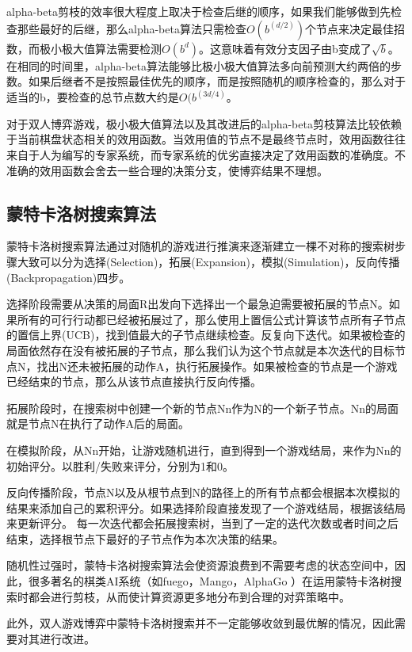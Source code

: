 \documentclass[c5size]{ctexart}
\begin{document}
	alpha-beta剪枝的效率很大程度上取决于检查后继的顺序，如果我们能够做到先检查那些最好的后继，那么alpha-beta算法只需检查$O(b^(d/2))$个节点来决定最佳招数，而极小极大值算法需要检测$O(b^d)$。这意味着有效分支因子由b变成了$\sqrt{b}$。在相同的时间里，alpha-beta算法能够比极小极大值算法多向前预测大约两倍的步数。如果后继者不是按照最佳优先的顺序，而是按照随机的顺序检查的，那么对于适当的b，要检查的总节点数大约是$O(b^(3d/4)$。\par
	
	对于双人博弈游戏，极小极大值算法以及其改进后的alpha-beta剪枝算法比较依赖于当前棋盘状态相关的效用函数。当效用值的节点不是最终节点时，效用函数往往来自于人为编写的专家系统，而专家系统的优劣直接决定了效用函数的准确度。不准确的效用函数会舍去一些合理的决策分支，使博弈结果不理想。\par
	
\subsection{蒙特卡洛树搜索算法}
	蒙特卡洛树搜索算法通过对随机的游戏进行推演来逐渐建立一棵不对称的搜索树步骤大致可以分为选择(Selection)，拓展(Expansion)，模拟(Simulation)，反向传播(Backpropagation)四步。
	
	选择阶段需要从决策的局面R出发向下选择出一个最急迫需要被拓展的节点N。如果所有的可行行动都已经被拓展过了，那么使用上置信公式计算该节点所有子节点的置信上界(UCB)，找到值最大的子节点继续检查。反复向下迭代。如果被检查的局面依然存在没有被拓展的子节点，那么我们认为这个节点就是本次迭代的目标节点N，找出N还未被拓展的动作A，执行拓展操作。如果被检查的节点是一个游戏已经结束的节点，那么从该节点直接执行反向传播。
	
	拓展阶段时，在搜索树中创建一个新的节点Nn作为N的一个新子节点。Nn的局面就是节点N在执行了动作A后的局面。
	
	在模拟阶段，从Nn开始，让游戏随机进行，直到得到一个游戏结局，来作为Nn的初始评分。以胜利/失败来评分，分别为1和0。
	
	反向传播阶段，节点N以及从根节点到N的路径上的所有节点都会根据本次模拟的结果来添加自己的累积评分。如果选择阶段直接发现了一个游戏结局，根据该结局来更新评分。
	每一次迭代都会拓展搜索树，当到了一定的迭代次数或者时间之后结束，选择根节点下最好的子节点作为本次决策的结果。
	
	随机性过强时，蒙特卡洛树搜索算法会使资源浪费到不需要考虑的状态空间中，因此，很多著名的棋类AI系统（如fuego，Mango，AlphaGo ）在运用蒙特卡洛树搜索时都会进行剪枝，从而使计算资源更多地分布到合理的对弈策略中。
	
	此外，双人游戏博弈中蒙特卡洛树搜索并不一定能够收敛到最优解的情况，因此需要对其进行改进。
	
\end{document}
